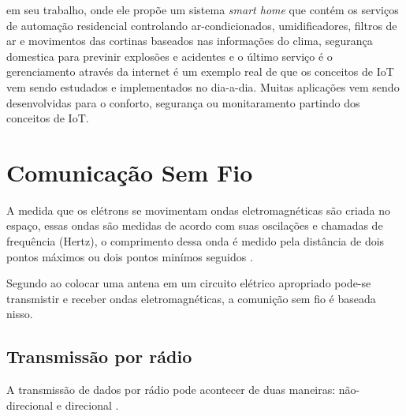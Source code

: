     \citeauthor{homesmart} em seu trabalho, onde ele propõe um sistema \textit{smart home} que contém os serviços de automação residencial controlando ar-condicionados, umidificadores, filtros de ar e movimentos das cortinas baseados nas informações do clima, segurança domestica para previnir explosões e acidentes e o último serviço é o gerenciamento através da internet é um exemplo real de que os conceitos de IoT vem sendo estudados e implementados no dia-a-dia. Muitas aplicações vem sendo desenvolvidas para o conforto, segurança ou monitaramento partindo dos conceitos de IoT.
    
\section{Comunicação Sem Fio}
    \par
    A medida que os elétrons se movimentam ondas eletromagnéticas são criada no espaço, essas ondas são medidas de acordo com suas oscilações e chamadas de frequência (Hertz), o comprimento dessa onda é medido pela distância de dois pontos máximos ou dois pontos minímos seguidos \cite{tenenbaum2002}.
    \par
    Segundo \citeauthor{tenenbaum2002} ao colocar uma antena em um circuito elétrico apropriado pode-se  transmistir e receber ondas 
    eletromagnéticas, a comunição sem fio é baseada nisso.
    
    \subsection{Transmissão por rádio}
        
        \par
        A transmissão de dados por rádio pode acontecer de duas maneiras: não-direcional e direcional  \cite{torres2001}.
        

